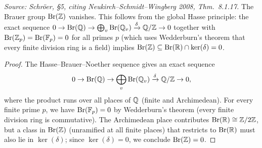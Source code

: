 \begin{lemma}[Vanishing of the Brauer group \(\Br(\ZZ) = 0\)]
  \label{lem:br-Z-vanishes}
  \uses{}
  \textit{Source: Schr\"oer, §5, citing Neukirch--Schmidt--Wingberg 2008, Thm.~8.1.17.}
  The Brauer group \(\operatorname{Br}(\mathbb{Z})\) vanishes.
  This follows from the global Hasse principle: the exact sequence
  \(0 \to \operatorname{Br}(\mathbb{Q}) \to \bigoplus_v \operatorname{Br}(\mathbb{Q}_v) \xrightarrow{\delta} \mathbb{Q}/\mathbb{Z} \to 0\)
  together with \(\operatorname{Br}(\mathbb{Z}_p) = \operatorname{Br}(\mathbb{F}_p) = 0\) for all primes \(p\)
  (which uses Wedderburn's theorem that every finite division ring is a field)
  implies \(\operatorname{Br}(\mathbb{Z}) \subseteq \operatorname{Br}(\mathbb{R}) \cap \ker(\delta) = 0\).
\end{lemma}
\begin{proof}
  The Hasse--Brauer--Noether sequence gives an exact sequence
  \[
    0 \to \operatorname{Br}(\mathbb{Q}) \to \bigoplus_{v} \operatorname{Br}(\mathbb{Q}_v) \xrightarrow{\delta} \mathbb{Q}/\mathbb{Z} \to 0,
  \]
  where the product runs over all places of \(\mathbb{Q}\) (finite and Archimedean).
  For every finite prime \(p\), we have \(\operatorname{Br}(\mathbb{F}_p) = 0\) by Wedderburn's theorem
  (every finite division ring is commutative).
  The Archimedean place contributes \(\operatorname{Br}(\mathbb{R}) \cong \mathbb{Z}/2\mathbb{Z}\), but a class
  in \(\operatorname{Br}(\mathbb{Z})\) (unramified at all finite places) that restricts to \(\operatorname{Br}(\mathbb{R})\)
  must also lie in \(\ker(\delta)\); since \(\ker(\delta) = 0\),
  we conclude \(\Br(\ZZ) = 0\).
\end{proof}

